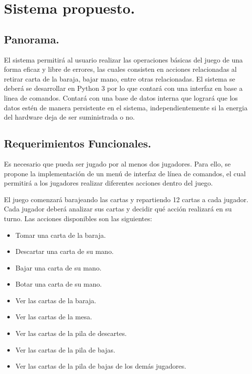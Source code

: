 \pagebreak

\section{Sistema propuesto.}\label{cap:sistema}
\subsection{Panorama.}\label{cap:panorama}

El sistema permitirá al usuario realizar las operaciones básicas del juego de una forma eficaz y libre de errores, las cuales consisten en acciones relacionadas al retirar carta de la baraja, bajar mano, entre otras relacionadas. El sistema se deberá se desarrollar en Python 3 por lo que contará con una interfaz en base a linea de comandos. Contará con una base de datos interna que logrará que los datos estén de manera persistente en el sistema, independientemente si la energia del hardware deja de ser suministrada o no.
\subsection{Requerimientos Funcionales.}\label{cap:requerimientos-funcionales}

Es necesario que pueda ser jugado por al menos dos jugadores. Para ello, se propone la implementación de un menú de interfaz de línea de comandos, el cual permitirá a los jugadores realizar diferentes acciones dentro del juego.

El juego comenzará barajeando las cartas y repartiendo 12 cartas a cada jugador. Cada jugador deberá analizar sus cartas y decidir qué acción realizará en su turno. Las acciones disponibles son las siguientes:
\begin{itemize}
  \item Tomar una carta de la baraja.
  \item Descartar una carta de su mano.
  \item Bajar una carta de su mano.
  \item Botar una carta de su mano.
  \item Ver las cartas de la baraja.
  \item Ver las cartas de la mesa.
  \item Ver las cartas de la pila de descartes.
  \item Ver las cartas de la pila de bajas.
  \item Ver las cartas de la pila de bajas de los demás jugadores.
\end{itemize}

